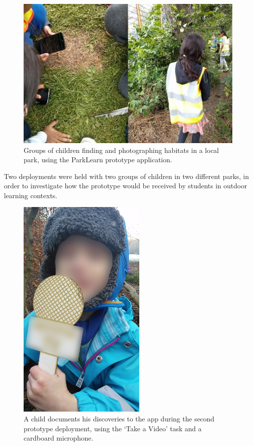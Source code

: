 \begin{figure}
  \centering
  \includegraphics[width=0.8\columnwidth]{images/chapter04/prototypeDeployment.jpg}
  \caption[Children during the ParkLearn summer school deployment]{Groups of children finding and photographing habitats in a local park, using the ParkLearn prototype application.}
  \label{fig:prototypeDeployment}
\end{figure}

Two deployments were held with two groups of children in two different parks, in order to investigate how the prototype would be received by students in outdoor learning contexts.

\begin{figure}
  \centering
  \includegraphics[width=0.35\columnwidth]{images/chapter04/microphone.png}
  \caption[A child completing a `Take a Video' Task]{A child documents his discoveries to the app during the second prototype deployment, using the `Take a Video' task and a cardboard microphone.}
  \label{fig:prototypeMicrophone}
\end{figure}

